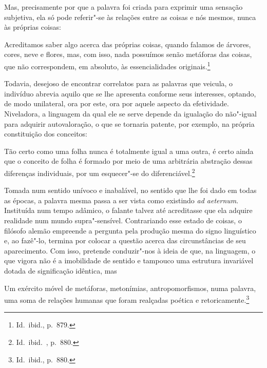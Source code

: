 Mas, precisamente por que a palavra foi criada para exprimir uma
sensação subjetiva, ela só pode referir"-se às relações entre as
coisas e nós mesmos, nunca às próprias coisas: 

\begin{hedraquote}
Acreditamos saber algo
acerca das próprias coisas, quando falamos de árvores, cores, neve e
flores, mas, com isso, nada possuímos senão metáforas das coisas, que
não correspondem, em absoluto, às essencialidades originais.\footnote{
Id.~ibid., p.~879.}
\end{hedraquote}

Todavia, desejoso de encontrar correlatos para as
palavras que veicula, o indivíduo abrevia aquilo que se lhe apresenta
conforme seus interesses, optando, de modo unilateral, ora por este,
ora por aquele aspecto da efetividade. Niveladora, a linguagem da qual
ele se serve depende da igualação do não"-igual para adquirir
autovaloração, o que se tornaria patente, por exemplo, na própria
constituição dos conceitos: 

\begin{hedraquote}
Tão certo como uma folha
nunca é totalmente igual a uma outra, é certo ainda que o conceito de
folha é formado por meio de uma arbitrária abstração dessas diferenças
individuais, por um esquecer"-se 
do diferenciável.\footnote{ Id.~ibid.~, p.~880.}
\end{hedraquote}

Tomada num sentido unívoco e inabalável, no sentido que lhe foi dado em
todas as épocas, a palavra mesma passa a ser vista como existindo
\textit{ad aeternum}. Instituída num tempo adâmico, o falante talvez
até acreditasse que ela adquire realidade num mundo
supra"-sensível. Contrariando esse estado de coisas, o filósofo alemão
empreende a pergunta pela produção mesma do signo linguístico e, ao
fazê"-lo, termina por colocar a questão acerca das circunstâncias de
seu aparecimento. Com isso, pretende conduzir"-nos à ideia de que, na
linguagem, o que vigora não é a imobilidade de sentido e tampouco uma
estrutura invariável dotada de significação idêntica, mas 

\begin{hedraquote}
Um exército
móvel de metáforas, metonímias, antropomorfismos, numa palavra, uma
soma de relações humanas que foram realçadas poética e
retoricamente.\footnote{ Id.~ibid., p.~880.}
\end{hedraquote}

